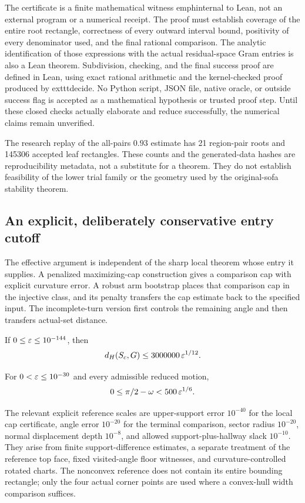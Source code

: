 The certificate is a finite mathematical witness emph{internal to Lean},
not an external program or a numerical receipt. The proof must establish
coverage of the entire root rectangle, correctness of every outward interval
bound, positivity of every denominator used, and the final rational comparison.
The analytic identification of those expressions with the actual
residual-space Gram entries is also a Lean theorem. Subdivision, checking,
and the final success proof are defined in Lean, using exact rational
arithmetic and the kernel-checked proof produced by 	exttt{decide}.
No Python script, JSON file, native oracle, or outside success flag is
accepted as a mathematical hypothesis or trusted proof step. Until these
closed checks actually elaborate and reduce successfully, the numerical
claims remain unverified.

The research replay of the all-pairs $0.93$ estimate has 21 region-pair roots
and 145306 accepted leaf rectangles. These counts and the generated-data hashes
are reproducibility metadata, not a substitute for a theorem. They do not
establish feasibility of the lower trial family or the geometry used by the
original-sofa stability theorem.

\subsection{An explicit, deliberately conservative entry cutoff}
\label{sec:quant-effective-cutoff}

The effective argument is independent of the sharp local theorem whose entry
it supplies. A penalized maximizing-cap construction gives a comparison cap
with explicit curvature error. A robust arm bootstrap places that comparison
cap in the injective class, and its penalty transfers the cap estimate back
to the specified input. The incomplete-turn version first controls the
remaining angle and then transfers actual-set distance.

\begin{proposition}
\label{prop:quant-effective-entry}
If $0\le\varepsilon\le10^{-144}$, then
\[
 d_H(S_c,G)\le3000000\,\varepsilon^{1/12}.
\]
\end{proposition}
\begin{proposition}
\label{prop:quant-effective-angle}
For $0<\varepsilon\le10^{-30}$ and every admissible reduced motion,
\[
 0\le\pi/2-\omega<500\,\varepsilon^{1/6}.
\]
\end{proposition}

The relevant explicit reference scales are upper-support error $10^{-40}$
for the local cap certificate, angle error $10^{-20}$ for the terminal
comparison, sector radius $10^{-20}$, normal displacement depth $10^{-8}$,
and allowed support-plus-hallway slack $10^{-10}$. They arise from finite
support-difference estimates, a separate treatment of the reference top face,
fixed visited-angle floor witnesses, and curvature-controlled rotated charts.
The nonconvex reference does not contain its entire bounding rectangle;
only the four actual corner points are used where a convex-hull width
comparison suffices.

